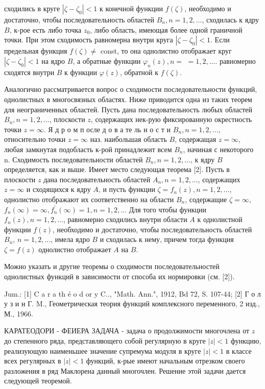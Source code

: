 \documentclass[10pt]{article}
\begin{document}
сходились в круге $\left|\zeta-\zeta_{0}\right|<1$ к конечной функции $f(\zeta)$, необходимо и достаточно, чтобы последовательность областей $B_{n}, n=1,2, \ldots$, сходилась к ядру $B$, к-рое есть либо точка $z_{0}$, либо область, имеющая более одной граничной точки. При этом сходимость равномерна внутри круга $\left|\zeta-\zeta_{0}\right|<1$. Если предельная функция $f(\zeta) \neq$ const, то она однолистно отображает круг $\left|\zeta-\zeta_{0}\right|<1$ на ядро $B$, а обратные функции $\varphi_{n}(z), n=$ $=1,2, \ldots$. равномерно сходятся внутри $B$ к функции $\varphi(z)$, обратной к $f(\zeta)$.



Аналогично рассматривается вопрос о сходимости последовательности функций, однолистных в многосвязных областях. Ниже приводится одна из таких теорем для неограниченных областей. Пусть дана последовательность любых областей $B_{n}, n=1,2, \ldots$, плоскости $z$, содержащих нек-рую фиксированную окрестность точки $z=\infty$. Я д р о м п осле д о в а те ль н о с т и $B_{n}, n=1,2, \ldots$, относительно точки $z=\infty$ наз. наибольшая область $B$, содержащая $z=\infty$, любая замкнутая подобласть к-рой принадлежит всем $B_{n}$, начиная с некоторого n. Сходимость последовательности областей $B_{n}, n=1,2, \ldots$, к ядру $B$ определяется, как и выше. Имеет место следующая теорема [2]. Пусть в плоскости $z$ дана последовательность областей $A_{n}, n=1,2, \ldots$, содержащих $z=\infty$ и сходящихся к ядру $A$, и пусть функции $\zeta=f_{n}(z), n=1,2, \ldots$, однолистно отображают их соответственно на области $B_{n}$, содержащие $\zeta=\infty$, $f_{n}(\infty)=\infty, f_{n}^{\prime}(\infty)=1, n=1,2, \ldots$ Для того чтобы функции $f_{n}(z), n=1,2, \ldots$, равномерно сходились внутри области $A$ к однолистной функции $f(z)$, необходимо и достаточно, чтобы последовательность областей $B_{n}$, $n=1,2, \ldots$, имела ядро $B$ и сходилась к нему, причем тогда функция $\zeta=f(z)$ однолистно отображает $A$ на $B$.



Можно указать и другие теоремы о сходимости последовательностей однолистных функций в зависимости от способа их нормировки (см. [2]).



Jum.: [1] C a r a th é o d or y C.., "Math. Ann.", 1912, Bd 72, S. 107-44; [2] Г о л у з и н Г. M., Геометрическая теория функций комплексного переменного, 2 изд., М., 1966.



КАРАТЕОДОРИ - ФЕИЕРА ЗАДАЧА - задача о продолжимости многочлена от $z$ до степенного ряда, представляющего собой регулярную в круге $|z|<1$ функцию, реализующую наименьшее значение супремума модуля в круге $|z|<1$ в классе всех регулярных в $|z|<1$ функций, к-рые имеют начальным отрезком своего разложения в ряд Маклорена данный многочлен. Решение этой задачи дается следующей теоремой.
\end{document}
